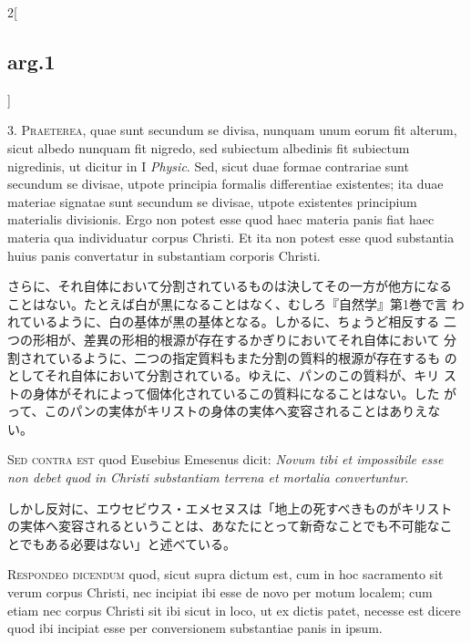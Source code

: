 \documentclass[paper=a4paper,fontsize=10pt,jafontsize=9pt,titlepage]{jlreq}
\begin{document}
\begin{paracol}{2}[\subsection{arg.1}]

3. {\scshape Praeterea}, quae sunt secundum se divisa, nunquam unum
eorum fit alterum, sicut albedo nunquam fit nigredo, sed subiectum
albedinis fit subiectum nigredinis, ut dicitur in I {\itshape
Physic}. Sed, sicut duae formae contrariae sunt secundum se divisae,
utpote principia formalis differentiae existentes; ita duae materiae
signatae sunt secundum se divisae, utpote existentes principium
materialis divisionis. Ergo non potest esse quod haec materia panis
fiat haec materia qua individuatur corpus Christi. Et ita non potest
esse quod substantia huius panis convertatur in substantiam corporis
Christi.

\switchcolumn

さらに、それ自体において分割されているものは決してその一方が他方になる
ことはない。たとえば白が黒になることはなく、むしろ『自然学』第1巻で言
われているように、白の基体が黒の基体となる。しかるに、ちょうど相反する
二つの形相が、差異の形相的根源が存在するかぎりにおいてそれ自体において
分割されているように、二つの指定質料もまた分割の質料的根源が存在するも
のとしてそれ自体において分割されている。ゆえに、パンのこの質料が、キリ
ストの身体がそれによって個体化されているこの質料になることはない。した
がって、このパンの実体がキリストの身体の実体へ変容されることはありえな
い。

\switchcolumn*[\subsection{s.c.}]

{\scshape Sed contra est} quod Eusebius Emesenus dicit: {\itshape
Novum tibi et impossibile esse non debet quod in Christi substantiam
terrena et mortalia convertuntur}.

\switchcolumn

しかし反対に、エウセビウス・エメセヌスは「地上の死すべきものがキリスト
の実体へ変容されるということは、あなたにとって新奇なことでも不可能なこ
とでもある必要はない」と述べている。


{\scshape Respondeo dicendum} quod, sicut supra dictum est, cum in hoc
sacramento sit verum corpus Christi, nec incipiat ibi esse de novo per
motum localem; cum etiam nec corpus Christi sit ibi sicut in loco, ut
ex dictis patet, necesse est dicere quod ibi incipiat esse per
conversionem substantiae panis in ipsum.


\end{paracol}
\end{document}
